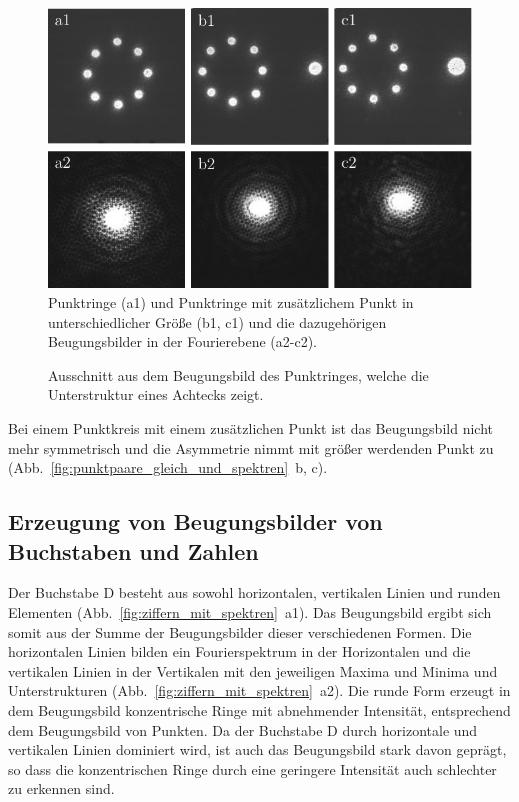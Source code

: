 \begin{figure}[h]
	\centering
	\includegraphics{images/Regina/abb17.pdf}
	\caption[Punktringe mit Fourierspektren]{
		Punktringe (a1) und Punktringe mit zusätzlichem Punkt in unterschiedlicher Größe (b1, c1) und die dazugehörigen Beugungsbilder in der Fourierebene (a2-c2).
	}
	\label{fig:punktringe_und_spektrum}
\end{figure}

\begin{figure}[h]
	\centering
	\caption[Beugungsbild der Punktringe mit vergrößertem Ausschnitt]{
		Ausschnitt aus dem Beugungsbild des Punktringes, welche die Unterstruktur eines Achtecks zeigt.
	}
	\label{fig:punktringe_ausschnitt}
\end{figure}

Bei einem Punktkreis mit einem zusätzlichen Punkt ist das Beugungsbild nicht mehr symmetrisch und die Asymmetrie nimmt mit größer werdenden Punkt zu (Abb.~\ref{fig:punktpaare_gleich_und_spektren}~b, c).


\subsection{Erzeugung von Beugungsbilder von Buchstaben und Zahlen}

Der Buchstabe D besteht aus sowohl horizontalen, vertikalen Linien und runden Elementen (Abb.~\ref{fig:ziffern_mit_spektren}~a1). Das Beugungsbild ergibt sich somit aus der Summe der Beugungsbilder dieser verschiedenen Formen. Die horizontalen Linien bilden ein Fourierspektrum in der Horizontalen und die vertikalen Linien in der Vertikalen mit den jeweiligen Maxima und Minima und Unterstrukturen (Abb.~\ref{fig:ziffern_mit_spektren}~a2). Die runde Form erzeugt in dem Beugungsbild konzentrische Ringe mit abnehmender Intensität, entsprechend dem Beugungsbild von Punkten. Da der Buchstabe D durch horizontale und vertikalen Linien dominiert wird, ist auch das Beugungsbild stark davon geprägt, so dass die konzentrischen Ringe durch eine geringere Intensität auch schlechter zu erkennen sind.

